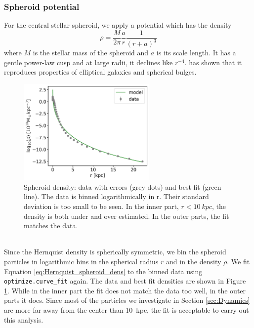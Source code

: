 \subsubsection{Spheroid potential}\label{subsubsec:spher_pot}
For the central stellar spheroid, we apply a \citet{Hernquistprofile} potential which has the density 
\begin{equation}\label{eq:Hernquist_spheroid_dens}
    \rho = \frac{M}{2\pi}\frac{a}{r}\frac{1}{(r+a)^3}
\end{equation}
where $M$ is the stellar mass of the spheroid and $a$ is its scale length. It has a gentle power-law cusp and at large radii, it declines like $r^{-4}$. \citet{Hernquistprofile} has shown that it reproduces properties of elliptical galaxies and spherical bulges. 
\\
\begin{figure}
\captionsetup{format=plain}
    \centering
    \includegraphics[width=0.6\textwidth]{plots/Auriga/spheroid_density_fit_snap_127.png}
    \caption{Spheroid density: data with errors (grey dots) and best fit (green line). The data is binned logarithmically in r. Their standard deviation is too small to be seen. In the inner part, $r<\SI{10}{kpc}$, the density is both under and over estimated. In the outer parts, the fit matches the data.}
    \label{fig:spheroid_fit}
\end{figure}
\\Since the Hernquist density is spherically symmetric, we bin the spheroid particles in logarithmic bins in the spherical radius $r$ and in the density $\rho$. We fit Equation \ref{eq:Hernquist_spheroid_dens} to the binned data using \texttt{optimize.curve\_fit} again. The data and best fit densities are shown in Figure \ref{fig:spheroid_fit}. While in the inner part the fit does not match the data too well, in the outer parts it does. Since most of the particles we investigate in Section \ref{sec:Dynamics} are more far away from the center than \SI{10}{kpc}, the fit is acceptable to carry out this analysis.

